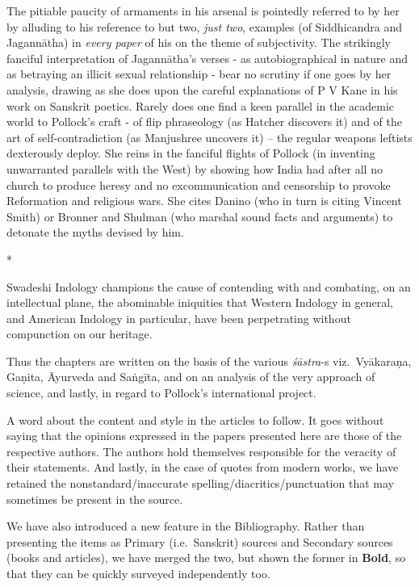 The pitiable paucity of armaments in his arsenal is pointedly referred to by her by alluding to his reference to but two, {\sl just two}, examples (of Siddhicandra and Jagannātha) in {\sl every paper} of his on the theme of subjectivity. The strikingly fanciful interpretation of Jagannātha’s verses - as autobiographical in nature and as betraying an illicit sexual relationship - bear no scrutiny if one goes by her analysis, drawing as she does upon the careful explanations of P V Kane in his work on Sanskrit poetics. Rarely does one find a keen parallel in the academic world to Pollock’s craft - of flip phraseology (as Hatcher discovers it) and of the art of self-contradiction (as Manjushree uncovers it) -- the regular weapons leftists dexterously deploy. She reins in the fanciful flights of Pollock (in inventing unwarranted parallels with the West) by showing how India had after all no church to produce heresy and no excommunication and censorship to provoke Reformation and religious wars. She cites Danino (who in turn is citing Vincent Smith) or Bronner and Shulman (who marshal sound facts and arguments) to detonate the myths devised by him. 
\vskip 5pt

\centerline{*\quad*\quad*}
\vskip 5pt

Swadeshi Indology champions the cause of contending with and combating, on an intellectual plane, the abominable iniquities that Western Indology in general, and American Indology in particular, have been perpetrating without compunction on our heritage.

Thus the chapters are written on the basis of the various {\sl śāstra}-s viz.\ Vyākaraṇa, Gaṇita, Āyurveda and Saṅgīta, and on an analysis of the very approach of science, and lastly, in regard to Pollock's international project.

A word about the content and style in the articles to follow. It goes without saying that the opinions expressed in the papers presented here are those of the respective authors. The authors hold themselves responsible for the veracity of their statements. And lastly, in the case of quotes from modern works, we have retained the nonstandard/inaccurate spelling/diacritics/punctuation that may sometimes be present in the source.

We have also introduced a new feature in the Bibliography. Rather than presenting the items as Primary (i.e.\ Sanskrit) sources and Secondary sources (books and articles), we have merged the two, but shown the former in {\bf Bold}, so that they can be quickly surveyed independently too.

